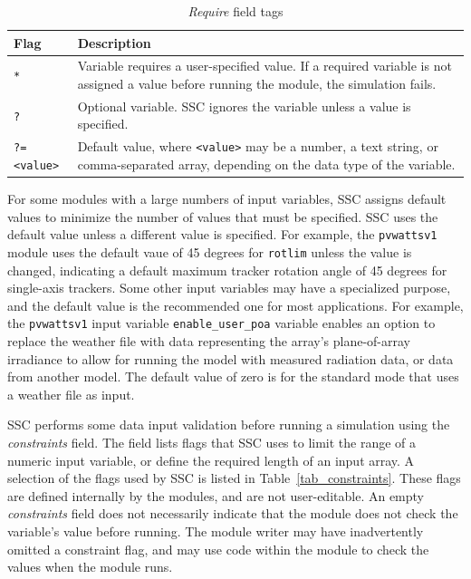 \documentclass{scrartcl} %
\begin{document}
\begin{table}[ht]
\begin{center}
\begin{tabular}{p{0.75in}p{4.75in}}
Flag & Description\\
\hline
\texttt{*} &  Variable requires a user-specified value. If a required variable is not assigned a value before running the module, the simulation fails.\\
\texttt{?} & Optional variable. SSC ignores the variable unless a value is specified.\\
\texttt{?=<value>} & Default value, where \texttt{<value>} may be a number, a text string, or comma-separated array, depending on the data type of the variable.\\
\end{tabular}
\caption{\emph{Require} field tags}
\label{tab_required}
\end{center}
\end{table}

For some modules with a large numbers of input variables, SSC assigns default values to minimize the number of values that must be specified. SSC uses the default value unless a different value is specified. For example, the \texttt{pvwattsv1} module uses the default vaue of 45 degrees for \texttt{rotlim} unless the value is changed, indicating a default maximum tracker rotation angle of 45 degrees for single-axis trackers. Some other input variables may have a specialized purpose, and the default value is the recommended one for most applications. For example, the \texttt{pvwattsv1} input variable \texttt{enable\_user\_poa} variable enables an option to replace the weather file with data representing the array's plane-of-array irradiance to allow for running the model with measured radiation data, or data from another model. The default value of zero is for the standard mode that uses a weather file as input.

SSC performs some data input validation before running a simulation using the \emph{constraints} field. The field lists flags that SSC uses to limit the range of a numeric input variable, or define the required length of an input array.  A selection of the flags used by SSC is listed in Table~\ref{tab_constraints}.  These flags are defined internally by the modules, and are not user-editable. An empty \emph{constraints} field does not necessarily indicate that the module does not check the variable's value before running. The module writer may have inadvertently omitted a constraint flag, and may use code within the module to check the values when the module runs.
\end{document}
